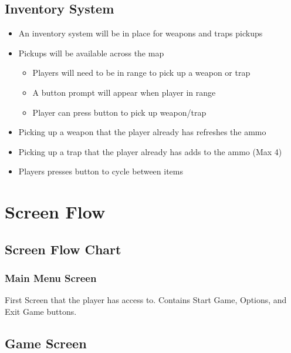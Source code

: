 \documentclass[14pt]{report}
\begin{document}
\subsection{Inventory System}

\begin{itemize}
    \item An inventory system will be in place for weapons and traps pickups
    \item Pickups will be available across the map 
    \begin{itemize}
        \item Players will need to be in range to pick up a weapon or trap
        \item A button prompt will appear when player in range
        \item Player can press button to pick up weapon/trap
    \end{itemize}
    \item Picking up a weapon that the player already has refreshes the ammo
    \item Picking up a trap that the player already has adds to the ammo (Max 4)
    \item Players presses button to cycle between items    
\end{itemize}

\section{Screen Flow}
\subsection{Screen Flow Chart}


\subsubsection{Main Menu Screen}

First Screen that the player has access to. Contains Start Game, Options, and Exit Game buttons.


\subsection{Game Screen}
\end{document}
